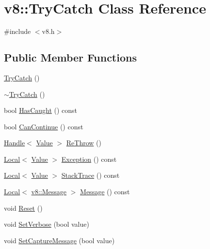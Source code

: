 \hypertarget{classv8_1_1_try_catch}{}\section{v8\+:\+:Try\+Catch Class Reference}
\label{classv8_1_1_try_catch}


{\ttfamily \#include $<$v8.\+h$>$}

\subsection*{Public Member Functions}
\begin{DoxyCompactItemize}
\item 
\hyperlink{classv8_1_1_try_catch_adc9b1b11e73b0325df727914c348053d}{Try\+Catch} ()
\item 
\hyperlink{classv8_1_1_try_catch_a2c9ad4b40d17dd31c6dd020736b30679}{$\sim$\+Try\+Catch} ()
\item 
bool \hyperlink{classv8_1_1_try_catch_a48f704fbf2b82564b5d2a4ff596e4137}{Has\+Caught} () const 
\item 
bool \hyperlink{classv8_1_1_try_catch_a2ec467d4653d26c064d749cab98791cb}{Can\+Continue} () const 
\item 
\hyperlink{classv8_1_1_handle}{Handle}$<$ \hyperlink{classv8_1_1_value}{Value} $>$ \hyperlink{classv8_1_1_try_catch_a4a7506617800bbc49c3c08bbfefb9c2d}{Re\+Throw} ()
\item 
\hyperlink{classv8_1_1_local}{Local}$<$ \hyperlink{classv8_1_1_value}{Value} $>$ \hyperlink{classv8_1_1_try_catch_a99c425f29b3355b4294cbe762377f99b}{Exception} () const 
\item 
\hyperlink{classv8_1_1_local}{Local}$<$ \hyperlink{classv8_1_1_value}{Value} $>$ \hyperlink{classv8_1_1_try_catch_a1ee3e6ee74a4fc50185443ccdc4d3ae7}{Stack\+Trace} () const 
\item 
\hyperlink{classv8_1_1_local}{Local}$<$ \hyperlink{classv8_1_1_message}{v8\+::\+Message} $>$ \hyperlink{classv8_1_1_try_catch_a2811e500fbb906ee505895a3d94fc66f}{Message} () const 
\item 
void \hyperlink{classv8_1_1_try_catch_a3aae8acab4c99b374b7d782763d4c8e1}{Reset} ()
\item 
void \hyperlink{classv8_1_1_try_catch_a032cd889d76bd596e2616df11ced8682}{Set\+Verbose} (bool value)
\item 
void \hyperlink{classv8_1_1_try_catch_a541b8fa6951bd5a439692c22d5c7b73c}{Set\+Capture\+Message} (bool value)
\end{DoxyCompactItemize}
